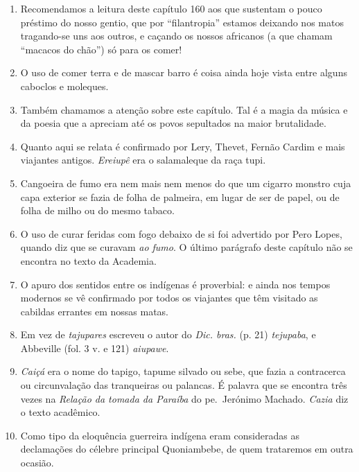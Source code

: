 \begin{enumerate}
\item Recomendamos a leitura deste capítulo 160 aos que sustentam o pouco préstimo do 
nosso gentio, que por ``filantropia'' estamos deixando nos matos tragando-se uns aos 
outros, e caçando os nossos africanos (a que chamam ``macacos do chão'') só para os 
comer!

\item O uso de comer terra e de mascar barro é coisa ainda hoje vista entre alguns 
caboclos e moleques.

\item Também chamamos a atenção sobre este capítulo. Tal é a magia da música e da 
poesia que a apreciam até os povos sepultados na maior brutalidade.

\item Quanto aqui se relata é confirmado por Lery, Thevet, Fernão Cardim e mais 
viajantes antigos. \textit{Ereiupê} era o salamaleque da raça tupi.

\item Cangoeira de fumo era nem mais nem menos do que um cigarro monstro cuja capa 
exterior se fazia de folha de palmeira, em lugar de ser de papel, ou de folha de milho ou 
do mesmo tabaco.

\item O uso de curar feridas com fogo debaixo de si foi advertido por Pero Lopes, 
quando diz que se curavam \textit{ao fumo}. O último parágrafo deste capítulo não se encontra no texto da Academia.

\item O apuro dos sentidos entre os indígenas é proverbial: e ainda nos tempos modernos 
se vê confirmado por todos os viajantes que têm visitado as cabildas errantes em nossas 
matas.

\item Em vez de \textit{tajupares} escreveu o autor do \textit{Dic. bras.} (p. 21) \textit{tejupaba}, e Abbeville 
(fol. 3 v. e 121) \textit{aiupawe}.

\item \textit{Caiçá} era o nome do tapigo, tapume silvado ou sebe, que fazia a contracerca ou 
circunvalação das tranqueiras ou palancas. É palavra que se encontra três vezes na  
\textit{Relação da tomada da Paraíba} do pe.~Jerónimo Machado.  \textit{Cazia} diz o texto acadêmico.

\item Como tipo da eloquência guerreira indígena eram consideradas as declamações do 
célebre principal Quoniambebe, de quem trataremos em outra ocasião.


\end{enumerate}
